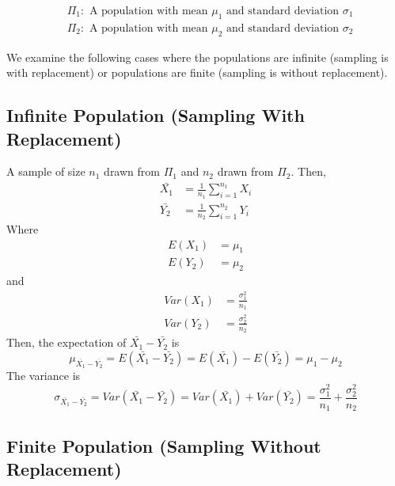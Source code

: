 \documentclass[
]{article}
\begin{document}
\[\begin{aligned}
&\Pi_1: \text{ A population with mean $\mu_1$ and standard deviation $\sigma_1$} \\
&\Pi_2: \text{ A population with mean $\mu_2$ and standard deviation $\sigma_2$}
\end{aligned}\]

We examine the following cases where the populations are infinite
(sampling is with replacement) or populations are finite (sampling is
without replacement).

\hypertarget{infinite-population-sampling-with-replacement}{%
\subsection{Infinite Population (Sampling With
Replacement)}\label{infinite-population-sampling-with-replacement}}

A sample of size \(n_1\) drawn from \(\Pi_1\) and \(n_2\) drawn from
\(\Pi_2\). Then, \[\begin{aligned}
\bar{X_1} &= \frac{1}{n_1}\sum_{i = 1}^{n_1}X_i \\
\bar{Y_2} &= \frac{1}{n_2}\sum_{i = 1}^{n_2}Y_i
\end{aligned}\] Where \[\begin{aligned}
E(X_1) &= \mu_1 \\
E(Y_2) &= \mu_2
\end{aligned}\] and \[\begin{aligned}
Var(X_1) &= \frac{\sigma_1^2}{n_1} \\
Var(Y_2) &= \frac{\sigma_2^2}{n_2}
\end{aligned}\] Then, the expectation of \(\bar{X_1} - \bar{Y_2}\) is
\[\mu_{\bar{X_1} - \bar{Y_2}} = E(\bar{X_1} - \bar{Y_2}) = E(\bar{X_1}) - E(\bar{Y_2}) = \mu_1 - \mu_2\]
The variance is
\[\sigma_{\bar{X_1} - \bar{Y_2}} = Var(\bar{X_1} - \bar{Y_2}) = Var(\bar{X_1}) + Var(\bar{Y_2}) = \frac{\sigma_1^2}{n_1} + \frac{\sigma_2^2}{n_2}\]

\hypertarget{finite-population-sampling-without-replacement}{%
\subsection{Finite Population (Sampling Without
Replacement)}\label{finite-population-sampling-without-replacement}}
\end{document}
